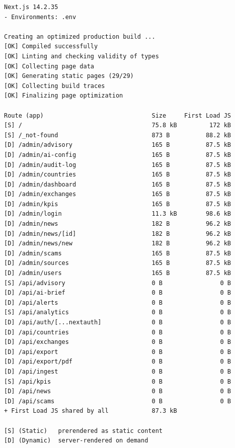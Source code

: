 \documentclass[12pt,a4paper]{article}
\begin{document}
\begin{verbatim}
Next.js 14.2.35
- Environments: .env

Creating an optimized production build ...
[OK] Compiled successfully
[OK] Linting and checking validity of types
[OK] Collecting page data
[OK] Generating static pages (29/29)
[OK] Collecting build traces
[OK] Finalizing page optimization

Route (app)                              Size     First Load JS
[S] /                                    75.8 kB         172 kB
[S] /_not-found                          873 B          88.2 kB
[D] /admin/advisory                      165 B          87.5 kB
[D] /admin/ai-config                     165 B          87.5 kB
[D] /admin/audit-log                     165 B          87.5 kB
[D] /admin/countries                     165 B          87.5 kB
[D] /admin/dashboard                     165 B          87.5 kB
[D] /admin/exchanges                     165 B          87.5 kB
[D] /admin/kpis                          165 B          87.5 kB
[D] /admin/login                         11.3 kB        98.6 kB
[D] /admin/news                          182 B          96.2 kB
[D] /admin/news/[id]                     182 B          96.2 kB
[D] /admin/news/new                      182 B          96.2 kB
[D] /admin/scams                         165 B          87.5 kB
[D] /admin/sources                       165 B          87.5 kB
[D] /admin/users                         165 B          87.5 kB
[S] /api/advisory                        0 B                0 B
[D] /api/ai-brief                        0 B                0 B
[D] /api/alerts                          0 B                0 B
[S] /api/analytics                       0 B                0 B
[D] /api/auth/[...nextauth]              0 B                0 B
[D] /api/countries                       0 B                0 B
[D] /api/exchanges                       0 B                0 B
[D] /api/export                          0 B                0 B
[D] /api/export/pdf                      0 B                0 B
[D] /api/ingest                          0 B                0 B
[S] /api/kpis                            0 B                0 B
[D] /api/news                            0 B                0 B
[D] /api/scams                           0 B                0 B
+ First Load JS shared by all            87.3 kB

[S] (Static)   prerendered as static content
[D] (Dynamic)  server-rendered on demand
\end{verbatim}
\end{document}

